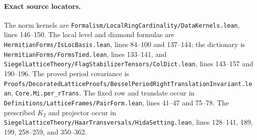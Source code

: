 \paragraph{Exact source locators.}
The norm kernels are
\texttt{Formalism/LocalRingCardinality/DataKernels.lean},
lines 146--150.  The local level and diamond formulas are
\texttt{HermitianForms/IsLocBasis.lean}, lines 84--100 and 137--144;
the dictionary is \texttt{HermitianForms/FormsTied.lean},
lines 133--141, and
\texttt{SiegelLatticeTheory/FlagStabilizerTensors/ColDict.lean},
lines 143--157 and 190--196.  The proved period covariance is
\texttt{Proofs/DecoratedLatticeProofs/BesselPeriodRightTranslationInvariant.lean},
\texttt{Core.Mi.per\_rTrans}.  The fixed row and translate occur in
\texttt{Definitions/LatticeFrames/PairForm.lean}, lines 41--47 and
75--78.  The prescribed $K_2$ and projector occur in
\texttt{SiegelLatticeTheory/HaarTransversals/HidaSetting.lean},
lines 128--141, 189, 199, 258--259, and 350--362.
